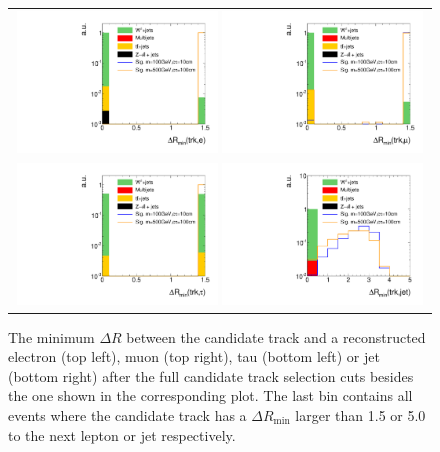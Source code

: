\begin{figure}[!t]
  \centering 
  \begin{tabular}{c}
    \includegraphics[width=0.49\textwidth]{figures/analysis/AnalysisSelection/htrackdRminElec_log.pdf}
    \includegraphics[width=0.49\textwidth]{figures/analysis/AnalysisSelection/htrackdRminMuon_log.pdf}\\

    \includegraphics[width=0.49\textwidth]{figures/analysis/AnalysisSelection/htrackdRminTau_log.pdf}
    \includegraphics[width=0.49\textwidth]{figures/analysis/AnalysisSelection/htrackdRminJet_log.pdf}
  \end{tabular}
  \caption{The minimum $\Delta R$ between the candidate track and a reconstructed electron (top left), muon (top right), tau (bottom left) or jet (bottom right) 
           after the full candidate track selection cuts besides the one shown in the corresponding plot. 
           The last bin contains all events where the candidate track has a $\Delta R_{\text{min}}$ larger than 1.5 or 5.0 to the next lepton or jet respectively. }
  \label{fig:TrackdRmin}
\end{figure}


